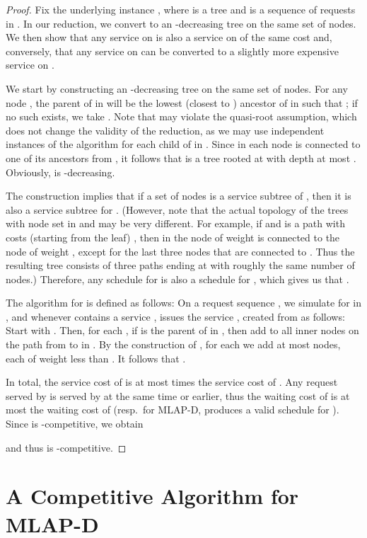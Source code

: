 \documentclass[a4paper]{article}
\newcommand{\MLAPD}{\mbox{\rm\textsf{MLAP-D}}}
\begin{document}
\begin{proof}
Fix the underlying instance , where  is
a tree and  is a sequence of requests in .  In our
reduction, we convert  to an -decreasing tree  on
the same set of nodes. We then show that any service on  is
also a service on  of the same cost and, conversely, that any
service on  can be converted to a slightly more expensive
service on .

We start by constructing 
an -decreasing tree  on the same set of nodes. For any node
, the parent of  in  will be the
lowest (closest to ) ancestor  of  in  such that
; if no such  exists, we take
. Note that  may violate the quasi-root assumption, which
does not change the validity of the reduction, as we may use
independent instances of the algorithm for each child of  in
.
Since in  each node  is connected to one of its ancestors
from , it follows that  is a tree rooted at  with
depth at most . Obviously,  is -decreasing.

The construction implies that if a set of nodes 
is a service subtree of , then it is also a service subtree for
.  (However, note that the actual topology of
the trees with node set  in  and  may be very different.
For example, if  and  is a path with costs
(starting from the leaf) , then in  the
node of weight  is connected to the node of weight ,
except for the last three nodes that are connected to . Thus the
resulting tree consists of three paths ending at  with roughly
the same number of nodes.)
Therefore, any schedule for  is also a schedule for , which gives us that .

The algorithm  for  is defined as follows: On a request
sequence , we simulate  for  in , and
whenever  contains a service ,  issues the service
, created from  as follows:
Start with . Then,
for each , if  is the parent of  in , then
add to  all inner nodes on the path from  to  in
. By the construction of , for each  we add at most
 nodes, each of weight less than . It follows that
.

In total, the service cost of  is at most  times the
service cost of . Any request served by  is served by
 at the same time or earlier, thus the waiting cost of 
is at most the waiting cost of  (resp.~for {\MLAPD}, 
produces a valid schedule for ). 
Since  is -competitive, we obtain 

and thus  is -competitive.
\end{proof}





\section{A Competitive Algorithm for {\MLAPD}}
\label{sec: competitive algorithm for mlap-d}
\end{document}

